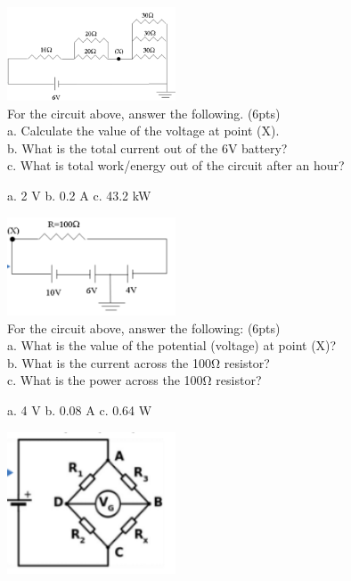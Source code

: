 \documentclass[10pt]{examdesign}
\begin{document}
\begin{shortanswer}[title={Short Answer},rearrange=no,resetcounter=no]
\begin{question}
        \includegraphics[width=5cm]{circuit1.png}
        \\For the circuit above, answer the following. (6pts)
        \\a. Calculate the value of the voltage at point (X). 
        \\b. What is the total current out of the 6V battery? 
        \\c. What is total work/energy out of the circuit after an hour? 
        \begin{answer}
        a. 2 V
        b. 0.2 A
        c. 43.2 kW
        \end{answer}
        \end{question}
        \begin{question}
        \includegraphics[width=5cm]{circuit2.png}
        \\For the circuit above, answer the following: (6pts)
        \\a. What is the value of the potential (voltage) at point (X)?
        \\b. What is the current across the 100Ω resistor? 
        \\c. What is the power across the 100Ω resistor?
        \begin{answer}
        a. 4 V
        b. 0.08 A
        c. 0.64 W
        \end{answer}
        \end{question}
        \begin{question}
        \includegraphics[width=5cm]{circuit3.png}

\end{question}
\end{shortanswer}
\end{document}
